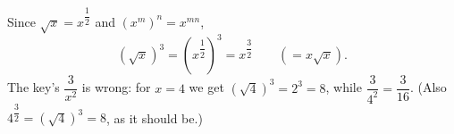 Since $\sqrt x=x^{\dfrac{1}{2}}$ and $\left(x^m\right)^n=x^{mn}$,
\[
\left(\sqrt x\right)^3=\left(x^{\dfrac{1}{2}}\right)^3=\boxed{x^{\dfrac{3}{2}}}\qquad\left(=x\sqrt x\right).
\]
The key's $\dfrac{3}{x^2}$ is wrong: for $x=4$ we get $\left(\sqrt4\right)^3=2^3=8$, while $\dfrac{3}{4^2}=\dfrac{3}{16}$. (Also $4^{\dfrac{3}{2}}=\left(\sqrt4\right)^3=8$, as it should be.)
